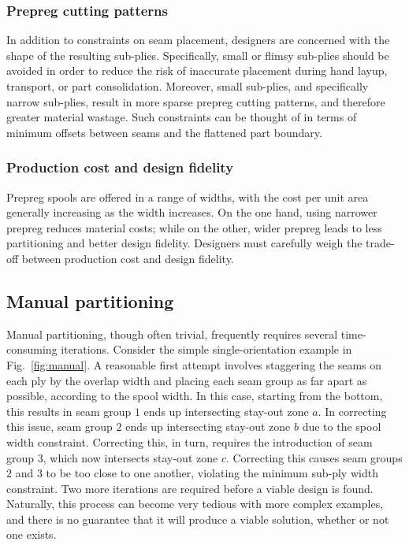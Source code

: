 \subsubsection{Prepreg cutting patterns}
In addition to constraints on seam placement, designers are concerned with the shape of the resulting sub-plies. Specifically, small or flimsy sub-plies should be avoided in order to reduce the risk of inaccurate placement during hand layup, transport, or part consolidation. Moreover, small sub-plies, and specifically narrow sub-plies, result in more sparse prepreg cutting patterns, and therefore greater material wastage. Such constraints can be thought of in terms of minimum offsets between seams and the flattened part boundary.

\subsubsection{Production cost and design fidelity}
Prepreg spools are offered in a range of widths, with the cost per unit area generally increasing as the width increases. On the one hand, using narrower prepreg reduces material costs; while on the other, wider prepreg leads to less partitioning and better design fidelity. Designers must carefully weigh the trade-off between production cost and design fidelity. 

\subsection{Manual partitioning}
Manual partitioning, though often trivial, frequently requires several time-consuming iterations. Consider the simple single-orientation example in Fig.~\ref{fig:manual}. A reasonable first attempt involves staggering the seams on each ply by the overlap width and placing each seam group as far apart as possible, according to the spool width. In this case, starting from the bottom, this results in seam group $1$ ends up intersecting stay-out zone $a$. In correcting this issue, seam group $2$ ends up intersecting stay-out zone $b$ due to the spool width constraint. Correcting this, in turn, requires the introduction of seam group $3$, which now intersects stay-out zone $c$. Correcting this causes seam groups $2$ and $3$ to be too close to one another, violating the minimum sub-ply width constraint. Two more iterations are required before a viable design is found. Naturally, this process can become very tedious with more complex examples, and there is no guarantee that it will produce a viable solution, whether or not one exists.

